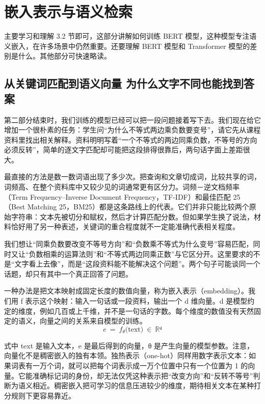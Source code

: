 \chapter{嵌入表示与语义检索}\label{嵌入表示与语义检索}

主要学习和理解 3.2 节即可，这部分讲解如何训练 BERT 模型，这种模型专注语义嵌入，在许多场景中仍然重要。还要理解 BERT 模型和 Transformer 模型的差别是什么。其他部分可快速略读。

\section{从关键词匹配到语义向量 为什么文字不同也能找到答案}\label{从关键词匹配到语义向量 为什么文字不同也能找到答案}

第二部分结束时，我们训练的模型已经可以把一段问题接着写下去。我们现在给它增加一个很朴素的任务：学生问``为什么不等式两边乘负数要变号''，请它先从课程资料里找出相关解释。资料明明写着``一个不等式的两边同乘负数，不等号的方向必须反转''，简单的逐文字匹配却可能把这段排得很靠后，两句话字面上差距很大。

最直接的方法是数一数词语出现了多少次。把查询和文章切成词，比较共享的词，词频高、在整个资料库中又较少见的词通常更有区分力。词频－逆文档频率（Term Frequency--Inverse Document Frequency，TF-IDF）和最佳匹配 25（Best Matching 25，BM25）都是这条路线上的代表。它们并非只能比较两个原始字符串：文本先被切分和赋权，然后才计算匹配分数。但如果学生换了说法，材料恰好用了另一种表述，关键词的重合程度就不一定能准确代表相关程度。

我们想让``同乘负数要改变不等号方向''和``负数乘不等式为什么变号''容易匹配，同时又让``负数相乘的运算法则''和``不等式两边同乘正数''与它区分开。这里要求的不是``文字看上去像''，而是``这段资料能不能解决这个问题''。两个句子可能谈同一个话题，却只有其中一个真正回答了问题。

一种办法是把文本映射成固定长度的数值向量，称为嵌入表示（embedding）。我们用 f 表示这个映射：输入一句话或一段资料，输出一个 d 维向量。d 是模型约定的维度，例如几百或上千维，并不是一句话的字数。每个维度的数值没有天然固定的语义，向量之间的关系来自模型的训练。
\[e\  = \ f_{\theta}(\text{text}\mathbb{)\  \in \ Rᵈ}\]

式中 text 是输入文本，e 是最后得到的向量，θ 是产生向量的模型参数。注意，向量化不是稠密嵌入的独有本领。独热表示（one-hot）同样用数字表示文本：如果词表有一万个词，就可以把每个词表示成一万个位置中只有一个位置为 1 的向量。它能准确标记词的身份，却无法仅凭这种表示把``改变方向''和``反转不等号''判断为语义相近。稠密嵌入把可学习的信息压进较少的维度，期待相关文本在某种打分规则下更容易靠近。

